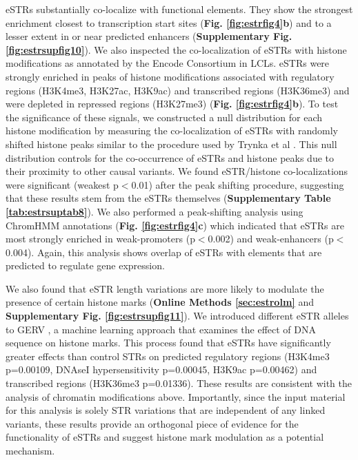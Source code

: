 eSTRs substantially co-localize with functional elements. They show the strongest enrichment closest to transcription start sites (\textbf{Fig. \ref{fig:estrfig4}b}) and to a lesser extent in or near predicted enhancers (\textbf{Supplementary Fig. \ref{fig:estrsupfig10}}). We also inspected the co-localization of eSTRs with histone modifications as annotated by the Encode Consortium \cite{ConsortiumDunhamKundajeEtAl2012} in LCLs. eSTRs were strongly enriched in peaks of histone modifications associated with regulatory regions (H3K4me3, H3K27ac, H3K9ac) and transcribed regions (H3K36me3) and were depleted in repressed regions (H3K27me3) (\textbf{Fig. \ref{fig:estrfig4}b}). To test the significance of these signals, we constructed a null distribution for each histone modification by measuring the co-localization of eSTRs with randomly shifted histone peaks similar to the procedure used by Trynka et al \cite{TrynkaWestraSlowikowskiEtAl2014}. This null distribution controls for the co-occurrence of eSTRs and histone peaks due to their proximity to other causal variants. We found eSTR/histone co-localizations were significant (weakest p$<$0.01) after the peak shifting procedure, suggesting that these results stem from the eSTRs themselves (\textbf{Supplementary Table \ref{tab:estrsuptab8}}). We also performed a peak-shifting analysis using ChromHMM annotations \cite{ErnstKellis2012} (\textbf{Fig. \ref{fig:estrfig4}c}) which indicated that eSTRs are most strongly enriched in weak-promoters (p$<$0.002) and weak-enhancers (p$<$0.004). Again, this analysis shows overlap of eSTRs with elements that are predicted to regulate gene expression.  

We also found that eSTR length variations are more likely to modulate the presence of certain histone marks (\textbf{Online Methods \ref{sec:estrolm}} and \textbf{Supplementary Fig. \ref{fig:estrsupfig11}}). We introduced different eSTR alleles to GERV \cite{ZengHashimotoKangEtAl2015a}, a machine learning approach that examines the effect of DNA sequence on histone marks. This process found that eSTRs have significantly greater effects than control STRs on predicted regulatory regions (H3K4me3 p=0.00109, DNAseI hypersensitivity p=0.00045, H3K9ac p=0.00462) and transcribed regions (H3K36me3 p=0.01336). These results are consistent with the analysis of chromatin modifications above. Importantly, since the input material for this analysis is solely STR variations that are independent of any linked variants, these results provide an orthogonal piece of evidence for the functionality of eSTRs and suggest histone mark modulation as a potential mechanism. 

